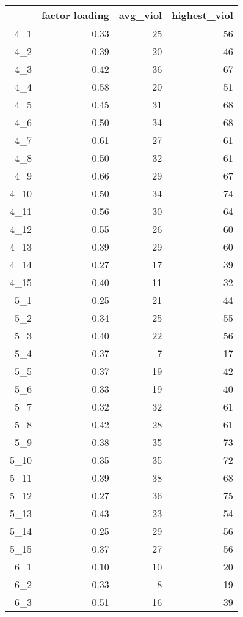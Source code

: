 \begin{table}[ht]
\centering
\begingroup\fontsize{9pt}{10pt}\selectfont
\begin{tabular}{rrrr}
  \toprule
 & factor loading & avg\_viol & highest\_viol \\ 
  \midrule
4\_1 & 0.33 & 25 & 56 \\ 
  4\_2 & 0.39 & 20 & 46 \\ 
  4\_3 & 0.42 & 36 & 67 \\ 
  4\_4 & 0.58 & 20 & 51 \\ 
  4\_5 & 0.45 & 31 & 68 \\ 
  4\_6 & 0.50 & 34 & 68 \\ 
  4\_7 & 0.61 & 27 & 61 \\ 
  4\_8 & 0.50 & 32 & 61 \\ 
  4\_9 & 0.66 & 29 & 67 \\ 
  4\_10 & 0.50 & 34 & 74 \\ 
  4\_11 & 0.56 & 30 & 64 \\ 
  4\_12 & 0.55 & 26 & 60 \\ 
  4\_13 & 0.39 & 29 & 60 \\ 
  4\_14 & 0.27 & 17 & 39 \\ 
  4\_15 & 0.40 & 11 & 32 \\ 
  5\_1 & 0.25 & 21 & 44 \\ 
  5\_2 & 0.34 & 25 & 55 \\ 
  5\_3 & 0.40 & 22 & 56 \\ 
  5\_4 & 0.37 & 7 & 17 \\ 
  5\_5 & 0.37 & 19 & 42 \\ 
  5\_6 & 0.33 & 19 & 40 \\ 
  5\_7 & 0.32 & 32 & 61 \\ 
  5\_8 & 0.42 & 28 & 61 \\ 
  5\_9 & 0.38 & 35 & 73 \\ 
  5\_10 & 0.35 & 35 & 72 \\ 
  5\_11 & 0.39 & 38 & 68 \\ 
  5\_12 & 0.27 & 36 & 75 \\ 
  5\_13 & 0.43 & 23 & 54 \\ 
  5\_14 & 0.25 & 29 & 56 \\ 
  5\_15 & 0.37 & 27 & 56 \\ 
  6\_1 & 0.10 & 10 & 20 \\ 
  6\_2 & 0.33 & 8 & 19 \\ 
  6\_3 & 0.51 & 16 & 39 \\ 

\end{tabular}
\end{table}
